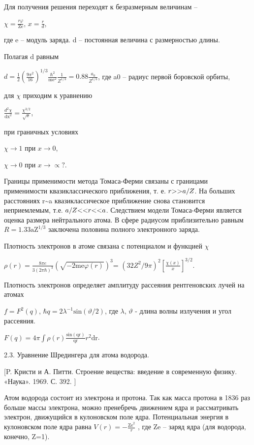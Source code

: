 \documentclass[a4paper,14pt, openany, twoside, draft]{extbook} %
\begin{document}
Для получения решения переходят к безразмерным величинам –

 $\chi =\frac{\mathit{r\varphi }}{{\text{Ze}}}$,  $x=\frac r d$,

где e – модуль заряда. d – постоянная величина с размерностью длины.

Полагая d равным

 $d=\frac 1 2\left(\frac{9\pi ^2}{16}\right)^{1/3}\frac{\hbar ^2}{{\text{me}}^2}\frac 1{Z^{1/3}}=0.88\frac{a_0}{Z^{1/3}}$, где a0 – радиус первой боровской орбиты,

для ${\chi}$  приходим к уравнению

 $\frac{d^2\chi }{{\text{dx}}^2}=\frac{\chi ^{3/2}}{\sqrt x}$,

при граничных условиях

 $\chi \rightarrow 1$ при  $x\rightarrow 0$,

 $\chi \rightarrow 0$ при  $x\rightarrow \propto ?$.

Границы применимости метода Томаса-Ферми связаны с границами применимости квазиклассического приближения, т. е.  $r\text{{\textgreater}{\textgreater}}a/Z$. На больших расстояниях r\~{}a квазиклассическое приближение снова становится неприемлемым, т.е.  $a/Z\text{{\textless}{\textless}}r\text{{\textless}{\textless}}a$. Следствием модели Томаса-Ферми является оценка размера нейтрального атома. В сфере радиусом приблизительно равным  $R=1.33{\text{aZ}}^{1/3}$ заключена половина полного электронного заряда.

Плотность электронов в атоме связана с потенциалом и функцией  $\chi $

 $\rho (r)=\frac{8\mathit{\pi e}}{3(2\pi \hbar )^3}\left(\sqrt{-2{\text{me}}\varphi (r)}\right)^3$= $\left(32Z^2/9\pi \right)^2\left[\frac{\chi (x)} x\right]^{3/2}$.

Плотность электронов определяет амплитуду рассеяния рентгеновских лучей на атомах

 $f=F^2(q)$,  $\hbar q=2\lambda ^{-1}\text{sin}(\vartheta /2)$, где ${\lambda}$,  $\vartheta $ - длина волны излучения и угол рассеяния.

 $F(q)=4\pi \int \rho (r)\frac{\text{sin}({\text{qr}})}{{\text{qr}}}r^2{\text{dr}}$.\ \ \ \

2.3. Уравнение Шредингера для атома водорода.

 [P. Кристи и  А. Питти. Строение вещества: введение в современную физику. «Наука». 1969. С. 392. ]

Атом водорода состоит из электрона и протона. Так как масса протона в 1836 раз больше массы электрона, можно пренебречь движением ядра и рассматривать электрон, движущийся в кулоновском поле ядра. Потенциальная энергия в кулоновском поле ядра равна  $V(r)=-\frac{{\text{Ze}}^2} r$ , где Ze – заряд ядра (для водорода, конечно, Z=1).
\end{document}
